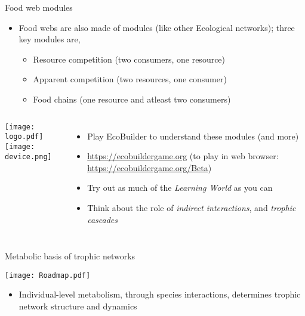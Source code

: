   \begin{frame}{Food web modules}
  
    \begin{itemize}[<+->] \itemsep6pt
       \item Food webs are also made of modules (like other Ecological networks); three key modules are,
       \begin{itemize}
         \item Resource competition (two consumers, one resource)
         \item Apparent competition (two resources, one consumer)
         \item Food chains (one resource and atleast two consumers)
       \end{itemize} 
    \end{itemize}
  
    \pause
    \begin{columns}[c]
      \centering
        \texttt{[image: logo.pdf]}\\
        \texttt{[image: device.png]}
      \centering
        \begin{itemize}[<+->] \itemsep3pt
          \item Play EcoBuilder to understand these modules (and more)
          \item \small \url{https://ecobuildergame.org} (to play in web browser: \url{https://ecobuildergame.org/Beta})
          \item Try out as much of the {\it Learning World} as you can\footnotemark
          \item Think about the role of {\it indirect interactions}, and {\it trophic cascades}
      \end{itemize}
    \end{columns} 


\end{frame}

\begin{frame}{Metabolic basis of trophic networks}

  \begin{center}
    \texttt{[image: Roadmap.pdf]}
  \end{center}
\vspace{10pt}
  \begin{itemize}\setlength{\itemindent}{0em} \itemsep4pt
    \item Individual-level metabolism, through species interactions, determines trophic network structure and dynamics
  \end{itemize}

\end{frame}

